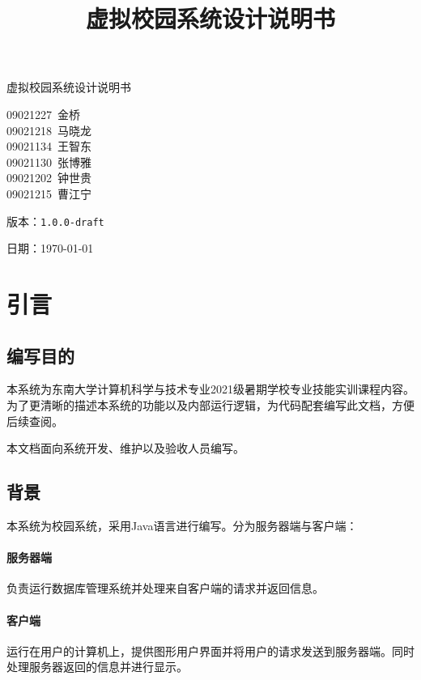 \documentclass{article}
\title{虚拟校园系统设计说明书}
\begin{document}
\begin{titlepage}
\vspace*{\fill}

\begin{center}
    {\Huge 虚拟校园系统设计说明书}

    \vspace{10cm}
{\large
09021227~金\phantom{金}桥 \\
09021218~马晓龙 \\
09021134~王智东 \\
09021130~张博雅 \\
09021202~钟世贵 \\
09021215~曹江宁
}

    \vspace{0.5cm}
    {\large 版本：\texttt{1.0.0-draft}}

    
\vspace{0.5cm}


    {\large 日期：\today}
\end{center}

\vspace*{\fill}
\end{titlepage}
\tableofcontents
\newpage

\section{引言}
\subsection{编写目的}

本系统为东南大学计算机科学与技术专业2021级暑期学校专业技能实训课程内容。为了更清晰的描述本系统的功能以及内部运行逻辑，为代码配套编写此文档，方便后续查阅。

本文档面向系统开发、维护以及验收人员编写。

\subsection{背景}

本系统为校园系统，采用Java语言进行编写。分为服务器端与客户端：

\paragraph{服务器端}
负责运行数据库管理系统并处理来自客户端的请求并返回信息。

\paragraph{客户端}
运行在用户的计算机上，提供图形用户界面并将用户的请求发送到服务器端。同时处理服务器返回的信息并进行显示。
\end{document}
